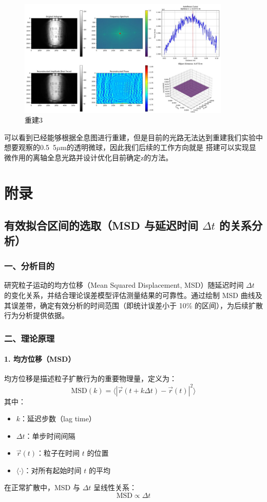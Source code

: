 \documentclass[a4paper]{report} %
\begin{document}
\begin{figure}[H]
    \centering
    \includegraphics[width=0.9\textwidth]{离轴3分辨率板.jpg}
    \caption{重建3}
\end{figure}
可以看到已经能够根据全息图进行重建，但是目前的光路无法达到重建我们实验中想要观察的0.5~5$\mu $m的透明微球，因此我们后续的工作方向就是
搭建可以实现显微作用的离轴全息光路并设计优化目前确定z的方法。
\chapter{附录}
\section{有效拟合区间的选取（MSD 与延迟时间 $\Delta t$ 的关系分析）}
\subsection*{一、分析目的}

研究粒子运动的均方位移（Mean Squared Displacement, MSD）随延迟时间 $\Delta t$ 的变化关系，并结合理论误差模型评估测量结果的可靠性。通过绘制 MSD 曲线及其误差带，确定有效分析的时间范围（即统计误差小于 10\% 的区间），为后续扩散行为分析提供依据。

\subsection*{二、理论原理}
\subsubsection*{1. 均方位移（MSD）}
均方位移是描述粒子扩散行为的重要物理量，定义为：
\[
\text{MSD}(k) = \langle |\vec{r}(t + k\Delta t) - \vec{r}(t)|^2 \rangle
\]
其中：
\begin{itemize}
    \item $k$：延迟步数（lag time）
    \item $\Delta t$：单步时间间隔
    \item $\vec{r}(t)$：粒子在时间 $t$ 的位置
    \item $\langle \cdot \rangle$：对所有起始时间 $t$ 的平均
\end{itemize}
在正常扩散中，MSD 与 $\Delta t$ 呈线性关系：
\[
\text{MSD} \propto \Delta t
\]
\end{document}
